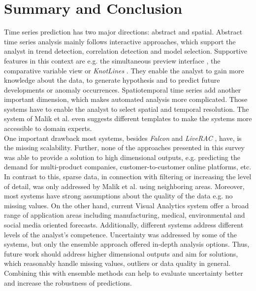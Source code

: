 \documentclass[electronic]{vgtc}             %
\begin{document}
\section{Summary and Conclusion}
Time series prediction has two major directions: abstract and spatial.
Abstract time series analysis mainly follows interactive approaches, which
support the analyst in trend detection, correlation detection and model selection. 
Supportive features in this context are e.g. the simultaneous preview interface \cite{buono:2007}, the comparative variable view \cite{steed:2017} or \textit{KnotLines}  \cite{Xie:2014}.
They enable the analyst to gain more knowledge about the data, to generate hypothesis and to predict future developments or anomaly occurrences.
Spatiotemporal time series add another important dimension, which makes automated analysis more complicated. 
Those systems have to enable the analyst to select spatial and temporal resolution.
The system of Malik et al. \cite{malik:2014} even suggests different templates to make the systems more accessible to domain experts.\\
One important drawback most systems, besides \textit{Falcon}  \cite{steed:2017} and \textit{LiveRAC} \cite{McLachlan:2008}, have, is the missing scalability. 
Further, none of the approaches presented in this survey was able to provide a solution to high dimensional outputs, e.g. predicting the demand for multi-product companies, customer-to-customer online platforms, etc.
In contrast to this, sparse data, in connection with filtering or increasing the level of detail, was only addressed by Malik et al. \cite{malik:2014} using neighboring areas.
Moreover, most systems have strong assumptions about the quality of the data e.g. no missing values.
On the other hand, current Visual Analytics system offer a broad range of application areas including manufacturing, medical, environmental and social media oriented forecasts.
Additionally, different systems address different levels of the analyst's competence.
Uncertainty was addressed by some of the systems, but only the ensemble approach \cite{koepp:2014} offered in-depth analysis options.
Thus, future work should address higher dimensional outputs and aim for solutions, which reasonably handle missing values, outliers or data quality in general.
Combining this with ensemble methods can help to evaluate uncertainty better and increase the robustness of predictions.

%
%
%

%


\end{document}
